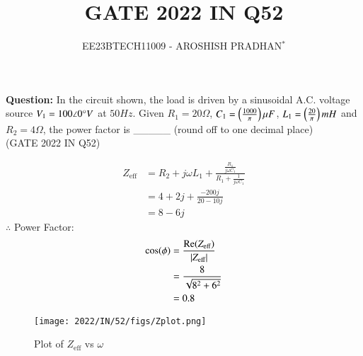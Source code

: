 \documentclass[journal,12pt,twocolumn]{IEEEtran}
\theoremstyle{remark}
\begin{document}

\vspace{3cm}

\title{GATE 2022 IN Q52}
\author{EE23BTECH11009 - AROSHISH PRADHAN$^{*}$%
}
\maketitle
\newpage
\bigskip
\textbf{Question:} In the circuit shown, the load is driven by a sinusoidal A.C. voltage source $V_1 = 100\angle0\degree V$ at $50Hz$. Given $R_1 = 20\Omega$, $C_1 = \left(\frac{1000}{\pi}\right)\mu F$, $L_1 = \left(\frac{20}{\pi}\right)mH$ and $R_2 = 4\Omega$, the power factor is \_\_\_\_\_ (round off to one decimal place)\\
\hfill(GATE 2022 IN Q52)


\solution
\fi


\begin{align}
    Z_{\text{eff}} &= R_2 + j\omega L_1 + \frac{\frac{R_1}{j\omega C_1}}{R_1 + \frac{1}{j\omega C_1}}\\
    &= 4 + 2j + \frac{-200j}{20 - 10j}\\
    &= 8-6j
\end{align}
$\therefore$ Power Factor:
\begin{align}
    \cos(\phi) &= \frac{\mathrm{Re}(Z_{\text{eff}})}{\left\vert Z_{\text{eff}}\right\vert}\\
    &= \frac{8}{\sqrt{8^2 + 6^2}}\\
    &= 0.8
\end{align}
\begin{figure}[!h]
    \centering
    \texttt{[image: 2022/IN/52/figs/Zplot.png]}
    \caption{Plot of $Z_{\text{eff}}$ vs $\omega$}
    \label{fig:2_gate.22.in.52}
\end{figure}
\end{document}
